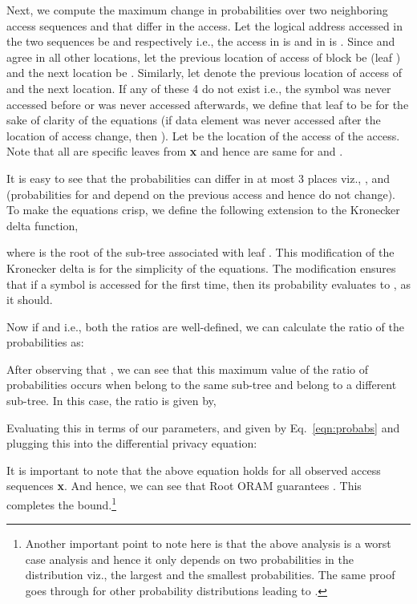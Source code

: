 \documentclass[USenglish,oneside,twocolumn]{article}
\newcommand{\ourprotocol}{Root ORAM}
\begin{document}
Next, we compute the maximum change in probabilities over two neighboring access sequences  and  that differ in the  access. Let the logical address accessed in the two sequences be   and  respectively i.e., the  access in  is  and in  is . Since  and  agree in all other locations, let the previous location of access of block  be  (leaf ) and the next location be . Similarly, let  denote the previous location of access of  and  the next location. If any of these 4 do not exist i.e., the symbol was never accessed before or was never accessed afterwards, we define that leaf to be  for the sake of clarity of the equations (if data element  was never accessed after the location of access change, then ). Let  be the location of the access of the  access. Note that  all are specific leaves from \textbf{x} and hence are same for   and .



It is easy to see that the probabilities can differ in at most 3 places viz., ,  and  (probabilities for  and  depend on the previous access and hence do not change). To make the equations crisp, we define the following extension to the Kronecker delta function, 

where  is the root of the sub-tree associated with leaf . This modification of the Kronecker delta is for the simplicity of the equations. The modification ensures that if a symbol is accessed for the first time, then its probability evaluates to , as it should. 


Now if  and  i.e., both the ratios are well-defined, we can calculate the ratio of the probabilities as:




After observing that , we can see that this maximum value of the ratio of probabilities occurs when  belong to the same sub-tree and  belong to a different sub-tree. In this case, the ratio is given by,


Evaluating this in terms of our parameters,  and  given by Eq.~\ref{eqn:probabs} and plugging this into the differential privacy equation:
  
It is important to note that the above equation holds for all observed access sequences \textbf{x}. And hence, we can see that \ourprotocol{} guarantees . This completes the  bound.\footnote{Another important point to note here is that the above analysis is a worst case analysis and hence it only depends on two probabilities in the distribution  viz., the largest and the smallest probabilities. The same proof goes through for other probability distributions leading to .} 
\end{document}
